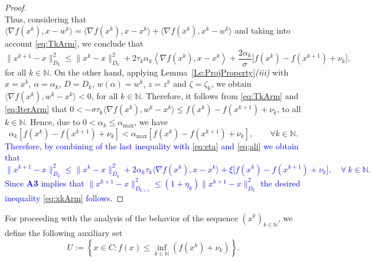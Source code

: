 \begin{proof}
$$	$$
	Thus, considering that $\big\langle \nabla f(x^k), x-w^k\big\rangle = \big\langle \nabla f(x^k), x-x^k\big\rangle + \big\langle \nabla f(x^k), x^k-w^k \big\rangle$ and taking into account \eqref{eq:TkArm}, we conclude that
	\begin{equation} \label{eq;ali}
		\|x^{k+1}-x\|_{D_k}^2 \leq  \|x^k-x\|_{D_k}^2 + 2\tau_k\alpha_k \left\langle \nabla f(x^k),x-x^k\right\rangle + \frac{2 \alpha_k}{\sigma} \big[f(x^k)-f(x^{k+1})+\nu_k\big],
	\end{equation}
	for all $ k \in \mathbb{N}$.  On the other hand, applying Lemma~\ref{Le:ProjProperty}{\it (iii)}  with $x=x^k$, $\alpha=\alpha_k$, $D = D_k$, $w(\alpha) = w^k$, $z = z^k$ and $\zeta= \zeta_k$, we obtain  $\langle \nabla f(x^k), w^k- x^k \rangle <  0$, for all  $ k \in \mathbb{N}$. Therefore, it follows from \eqref{eq:TkArm} and \eqref{eq:IterArm} that $0 < -\sigma\tau_{k} \big\langle \nabla f(x^{k}), w^{k}-x^{k} \big\rangle \leq f(x^{k}) - f(x^{k+1})+\nu_k$, to all $k \in \mathbb{N}$. Hence, due to $0< \alpha_k\leq  \alpha_{\max}$,  we have
	$$
		\alpha_k[f(x^k)-f(x^{k+1})+\nu_k] < \alpha_{\max} [f(x^k)-f(x^{k+1})+\nu_k], \qquad \forall k \in \mathbb{N}.
	$$
\textcolor{blue}{Therefore, by combining  of the  last inequality with \eqref{eq:eta} and  \eqref{eq;ali} we obtain that 
	$$
	\|x^{k+1}-x\|_{D_k}^2 \leq \|x^k-x\|_{D_k}^2 + 2\alpha_k\tau_k \big\langle \nabla f(x^k), x-x^k\big\rangle + \xi \big[f(x^k) - f(x^{k+1})+ \nu_k \big], \quad \forall ~k \in \mathbb{N}.
	$$
Since {\bf A3}  implies that $\|x^{k+1}-x\|_{D_{k+1}}^2\leq (1+\eta_k) \|x^{k+1}-x\|_{D_k}^2$ the desired inequality \eqref{eq:xkArm} follows.}
\end{proof}

For proceeding with the analysis of  the behavior of the sequence $(x^k)_{k\in\mathbb{N}}$,  we define the following auxiliary set
\begin{equation*}\label{eq:SetTArm}
	U := \left\{x \in C: f(x) \leq \inf_{k\in {\mathbb N}}\left(f(x^{k})+\nu_k\right) \right\}.
\end{equation*}

